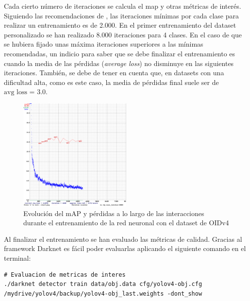 Cada cierto número de iteraciones se calcula el \gls{map} y otras métricas de interés. Siguiendo las recomendaciones de \cite{yolov4-darknet-github}, las iteraciones mínimas por cada clase para realizar un entrenamiento es de 2.000. En el primer entrenamiento del dataset personalizado se han realizado 8.000 iteraciones para 4 clases. En el caso de que se hubiera fijado unas máxima iteraciones superiores a las mínimas recomendadas, un indicio para saber que se debe finalizar el entrenamiento es cuando la media de las pérdidas (\textit{average loss}) no disminuye en las siguientes iteraciones. También, se debe de tener en cuenta que, en datasets con una dificultad alta, como es este caso, la media de pérdidas final suele ser de $\text{avg loss = 3.0}$.

\begin{figure}[ht]
\centering
\includegraphics[width=0.5\textwidth]{img/chapters/resultados/metricas/chart_train.png}
\caption{\label{fig:chart-train}Evolución del mAP y pérdidas a lo largo de las interacciones durante el entrenamiento de la red neuronal con el dataset de OIDv4}
\end{figure}

Al finalizar el entrenamiento se han evaluado las métricas de calidad. Gracias al framework Darknet \cite{darknet13} es fácil poder evaluarlas aplicando el siguiente comando en el terminal:

\vspace{0.5cm}
\begin{lstlisting}[language=iPython,caption=Evaluación métricas de calidad del dataset utilizado para el entrenamiento de la red neuronal de detección de objetos,captionpos=b,label={lst:darknet-map}]
# Evaluacion de metricas de interes
./darknet detector train data/obj.data cfg/yolov4-obj.cfg /mydrive/yolov4/backup/yolov4-obj_last.weights -dont_show
\end{lstlisting}

